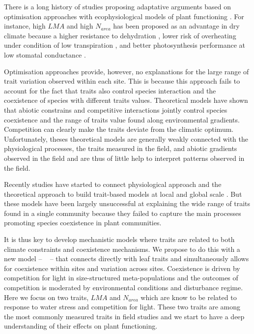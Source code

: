 \documentclass[a4paper,11pt]{article}
\begin{document}
There is a long history of studies
proposing adaptative arguments based on optimisation approaches with
ecophysiological models of plant functioning \citep{Makela-2002}. For instance, high $LMA$ and high $N_{area}$ has been proposed as an advantage in dry climate because
a higher resistance to dehydration
\citep{Wright-2002a,Wright-2002b}, lower risk of overheating
under condition of low transpiration \citep{Leigh-2012}, and better photosynthesis performance at low stomatal conductance \citep{Wright-2003}.

Optimisation approaches provide, however, no explanations for the large range of trait variation observed
within each site. This is because this approach fails to account for the fact that
traits also control species interaction and the coexistence of
species with different traits values. 
Theoretical models \citep{Case-2000,Goldberg-2006,Leimar-2008} have shown that abiotic constrains and competitive interactions jointly control species coexistence \citep{Chesson-2018} and the range of traits
value found along environmental gradients. Competition can clearly make the traits deviate from the climatic optimum.  Unfortunately, theses theoretical models are generally weakly connected with the physiological processes, the traits measured in the field, and abiotic gradients observed in the field and are thus of little help to interpret patterns observed in the field. 

Recently studies have started to connect physiological approach
and the theoretical approach to build trait-based models at local \citep{Farrior-2013} and global
scale \citep[see][]{Sakschewski-2015,Scheiter-2013}. But these models have been largely unsuccessful at explaining the wide range of traits found in a single community because they failed to capture the main processes promoting species coexistence in plant communities.

It is thus key to develop mechanistic models where traits are related
to both climate constraints and coexistence mechanisms. We propose to do this with a new model -- \plant\
\citep{Falster-2016,Falster-2017} -- that connects directly with leaf
traits and simultaneously allows for coexistence within sites and
variation across sites. Coexistence is driven by competition for light
in size-structured meta-populations and the outcomes of competition is
moderated by environmental conditions and disturbance regime. Here we focus on two traits, $LMA$ and $N_{area}$ which are know to be related to response to water stress and competition for light. These two traits are among the most commonly measured traits in field studies and we start to have a deep understanding of their effects on plant functioning. 
\end{document}
